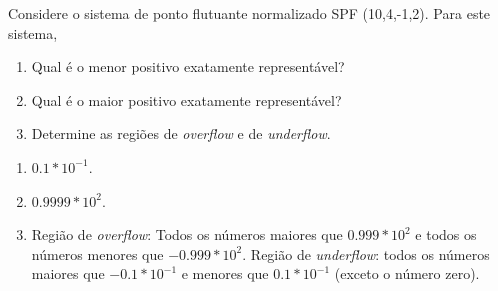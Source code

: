 \begin{ex}
Considere o sistema de ponto flutuante normalizado SPF (10,4,-1,2). Para este sistema,
\begin{enumerate}
[label=\alph*)]
\item Qual é o menor positivo exatamente representável?
\item Qual é o maior positivo exatamente representável?
\item Determine as regiões de \emph{overflow} e de \emph{underflow}.
\end{enumerate}
\begin{sol}
\begin{enumerate}
[label=\alph*)]
\item $0.1*10^{-1}$.
\item $0.9999*10^2$.
\item Região de \emph{overflow}: Todos os números maiores que $0.999*10^2$ e todos os números menores que $-0.999*10^2$. Região de \emph{underflow}: todos os números maiores que $-0.1*10^{-1}$ e menores que $0.1*10^{-1}$ (exceto o número zero).
\end{enumerate}
\end{sol}
\end{ex}




